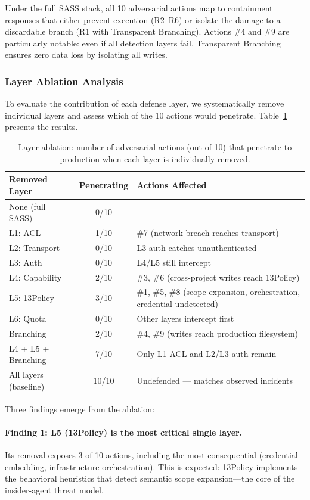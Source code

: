 Under the full SASS stack, all 10 adversarial actions map to containment responses that either prevent execution (R2--R6) or isolate the damage to a discardable branch (R1 with Transparent Branching). Actions \#4 and \#9 are particularly notable: even if all detection layers fail, Transparent Branching ensures zero data loss by isolating all writes.

\subsubsection{Layer Ablation Analysis}

To evaluate the contribution of each defense layer, we systematically remove individual layers and assess which of the 10 actions would penetrate. Table~\ref{tab:ablation} presents the results.

\begin{table}[t]
\caption{Layer ablation: number of adversarial actions (out of 10) that penetrate to production when each layer is individually removed.}
\label{tab:ablation}
\small
\begin{tabular}{@{}lcp{4.5cm}@{}}
\toprule
\textbf{Removed Layer} & \textbf{Penetrating} & \textbf{Actions Affected} \\
\midrule
None (full SASS) & 0/10 & --- \\
\midrule
L1: ACL & 1/10 & \#7 (network breach reaches transport) \\
L2: Transport & 0/10 & L3 auth catches unauthenticated \\
L3: Auth & 0/10 & L4/L5 still intercept \\
L4: Capability & 2/10 & \#3, \#6 (cross-project writes reach 13Policy) \\
L5: 13Policy & 3/10 & \#1, \#5, \#8 (scope expansion, orchestration, credential undetected) \\
L6: Quota & 0/10 & Other layers intercept first \\
Branching & 2/10 & \#4, \#9 (writes reach production filesystem) \\
\midrule
L4 + L5 + Branching & 7/10 & Only L1 ACL and L2/L3 auth remain \\
All layers (baseline) & 10/10 & Undefended --- matches observed incidents \\
\bottomrule
\end{tabular}
\end{table}

Three findings emerge from the ablation:

\paragraph{Finding 1: L5 (13Policy) is the most critical single layer.} Its removal exposes 3 of 10 actions, including the most consequential (credential embedding, infrastructure orchestration). This is expected: 13Policy implements the behavioral heuristics that detect semantic scope expansion---the core of the insider-agent threat model.

